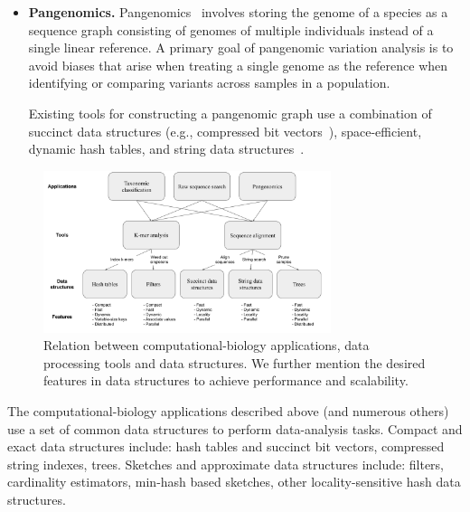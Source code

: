 \begin{itemize}[leftmargin=*]
\item {\bf Pangenomics.}
Pangenomics~\cite{garrison2018variation} involves storing the genome of a species as a sequence graph consisting of genomes of multiple individuals instead of a single linear reference. A primary goal of pangenomic variation analysis is to avoid biases that arise when treating a single genome as the reference when identifying or comparing variants across samples in a population.

Existing tools for constructing a pangenomic graph use a combination of succinct data structures (e.g., compressed bit vectors~\cite{garrison2018variation}), space-efficient, dynamic hash tables, and string data structures~\cite{pandey2021variantstore}.

\end{itemize}




\begin{figure}
\centering
\includegraphics[width=0.75\textwidth]{images/PPOSS_App_DS}
\caption{Relation between computational-biology applications, data processing tools and data structures. We further mention the desired features in data structures to achieve performance and scalability.}
\label{fig1}
\end{figure}


The computational-biology applications described above (and numerous others)  use a set of common data structures to perform data-analysis tasks.
Compact and exact data structures include: hash tables and succinct bit vectors, compressed string indexes, trees.
Sketches and approximate data structures include: filters, cardinality estimators,  min-hash based sketches, other locality-sensitive hash data structures.

